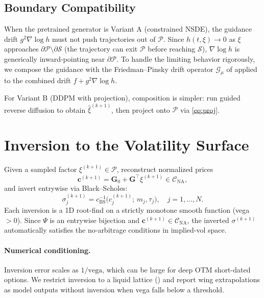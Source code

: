\documentclass{article}
\newcommand{\1}{\mathbf{1}}
\newcommand{\cP}{\mathcal{P}}
\newcommand{\cC}{\mathcal{C}}
\newcommand{\cS}{\mathcal{S}}
\newcommand{\cG}{\mathcal{G}}
\begin{document}
\subsection{Boundary Compatibility}

When the pretrained generator is Variant A (constrained NSDE), the guidance drift $g^2 \nabla \log h$ must not push trajectories out of $\cP$. Since $h(t, \xi) \to 0$ as $\xi$ approaches $\partial \cP \setminus \partial \cS$ (the trajectory can exit $\cP$ before reaching $\cS$), $\nabla \log h$ is generically inward-pointing near $\partial \cP$. To handle the limiting behavior rigorously, we compose the guidance with the Friedman--Pinsky drift operator $\cG_\mu$ of  applied to the combined drift $f + g^2 \nabla \log h$.

For Variant B (DDPM with projection), composition is simpler: run guided reverse diffusion to obtain $\hat\xi^{(k+1)}$, then project onto $\cP$ via \eqref{eq:proj}.

\section{Inversion to the Volatility Surface}
\label{sec:inversion}

Given a sampled factor $\xi^{(k+1)} \in \cP$, reconstruct normalized prices
\begin{equation}
\mathbf{c}^{(k+1)} = \mathbf{G}_0 + \mathbf{G}^\top \xi^{(k+1)} \in \cC_{\mathrm{NA}},
\label{eq:reconstruct}
\end{equation}
and invert entrywise via Black--Scholes:
\begin{equation}
\sigma^{(k+1)}_j = c_{\mathrm{BS}}^{-1}\bigl(c^{(k+1)}_j;\, m_j, \tau_j\bigr), \quad j = 1, \ldots, N.
\label{eq:bsinverse}
\end{equation}
Each inversion is a 1D root-find on a strictly monotone smooth function (vega $> 0$). Since $\Psi$ is an entrywise bijection and $\mathbf{c}^{(k+1)} \in \cC_{\mathrm{NA}}$, the inverted $\sigma^{(k+1)}$ automatically satisfies the no-arbitrage conditions in implied-vol space.

\paragraph{Numerical conditioning.} Inversion error scales as $1/\text{vega}$, which can be large for deep OTM short-dated options. We restrict inversion to a liquid lattice (\citet[Figure 3]{cohen2021}) and report wing extrapolations as model outputs without inversion when vega falls below a threshold.
\end{document}
